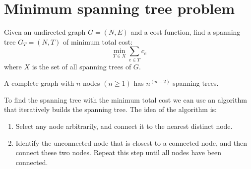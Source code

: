 \documentclass[12pt, a4paper]{report}
\begin{document}
    \section{Minimum spanning tree problem}
    Given an undirected graph $G=(N,E)$ and a cost function, find a spanning tree $G_T=(N,T)$ of minimum total cost: 
    \[\min_{T \in X} \sum_{e \in T}c_e\]
    where $X$ is the set of all spanning trees of $G$. 
    \begin{theorem}[Cayley]
        A complete graph with $n$ nodes $(n \geq 1)$ has $n^{(n-2)}$ spanning trees. 
    \end{theorem}
    To find the spanning tree with the minimum total cost we can use an algorithm that iteratively builds the spanning tree. The idea of the algorithm is: 
    \begin{enumerate}
        \item Select any node arbitrarily, and connect it to the nearest distinct node.
        \item Identify the unconnected node that is closest to a connected node, and then connect these two nodes. Repeat this step until all nodes have been connected.
    \end{enumerate}
\end{document}
